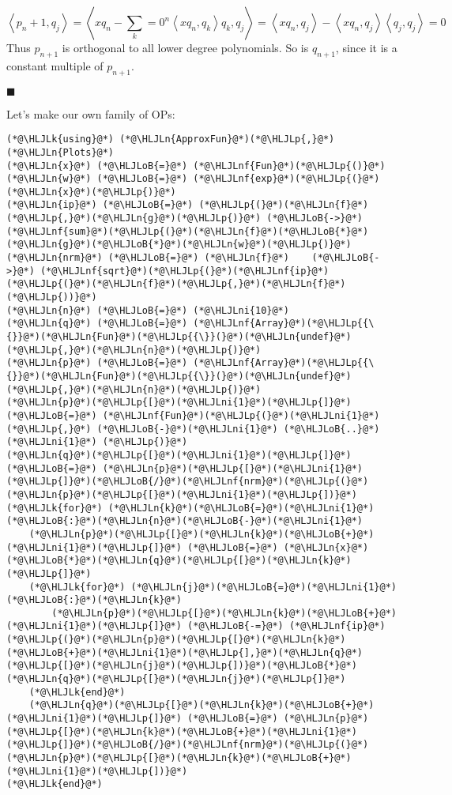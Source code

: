 \documentclass[12pt,landscape]{article}
\newcommand{\HLJLk}[1]{\textcolor[RGB]{148,91,176}{\textbf{#1}}}
\newcommand{\HLJLn}[1]{#1}
\newcommand{\HLJLnf}[1]{\textcolor[RGB]{66,102,213}{#1}}
\newcommand{\HLJLni}[1]{\textcolor[RGB]{59,151,46}{#1}}
\newcommand{\HLJLoB}[1]{\textcolor[RGB]{102,102,102}{\textbf{#1}}}
\newcommand{\HLJLp}[1]{#1}
\def\ip<#1>{\left\langle{#1}\right\rangle}
\begin{document}
{\[
\ip<p_{n+1}, q_j> = \ip<x q_n - \sum_{k=0}^n {\ip<x q_n, q_k>} q_k, q_j> = \ip<x q_n, q_j> - \ip<x q_n, q_j> \ip<q_j,q_j> = 0
\]
Thus $p_{n+1}$ is orthogonal to all lower degree polynomials. So is $q_{n+1}$, since it is a constant multiple of $p_{n+1}$.

\ensuremath{\blacksquare}

Let's make our own family of OPs:


\begin{lstlisting}
(*@\HLJLk{using}@*) (*@\HLJLn{ApproxFun}@*)(*@\HLJLp{,}@*) (*@\HLJLn{Plots}@*)
(*@\HLJLn{x}@*) (*@\HLJLoB{=}@*) (*@\HLJLnf{Fun}@*)(*@\HLJLp{()}@*)
(*@\HLJLn{w}@*) (*@\HLJLoB{=}@*) (*@\HLJLnf{exp}@*)(*@\HLJLp{(}@*)(*@\HLJLn{x}@*)(*@\HLJLp{)}@*)
(*@\HLJLn{ip}@*) (*@\HLJLoB{=}@*) (*@\HLJLp{(}@*)(*@\HLJLn{f}@*)(*@\HLJLp{,}@*)(*@\HLJLn{g}@*)(*@\HLJLp{)}@*) (*@\HLJLoB{->}@*) (*@\HLJLnf{sum}@*)(*@\HLJLp{(}@*)(*@\HLJLn{f}@*)(*@\HLJLoB{*}@*)(*@\HLJLn{g}@*)(*@\HLJLoB{*}@*)(*@\HLJLn{w}@*)(*@\HLJLp{)}@*)
(*@\HLJLn{nrm}@*) (*@\HLJLoB{=}@*) (*@\HLJLn{f}@*)    (*@\HLJLoB{->}@*) (*@\HLJLnf{sqrt}@*)(*@\HLJLp{(}@*)(*@\HLJLnf{ip}@*)(*@\HLJLp{(}@*)(*@\HLJLn{f}@*)(*@\HLJLp{,}@*)(*@\HLJLn{f}@*)(*@\HLJLp{))}@*)
(*@\HLJLn{n}@*) (*@\HLJLoB{=}@*) (*@\HLJLni{10}@*)
(*@\HLJLn{q}@*) (*@\HLJLoB{=}@*) (*@\HLJLnf{Array}@*)(*@\HLJLp{{\{}}@*)(*@\HLJLn{Fun}@*)(*@\HLJLp{{\}}(}@*)(*@\HLJLn{undef}@*)(*@\HLJLp{,}@*)(*@\HLJLn{n}@*)(*@\HLJLp{)}@*)
(*@\HLJLn{p}@*) (*@\HLJLoB{=}@*) (*@\HLJLnf{Array}@*)(*@\HLJLp{{\{}}@*)(*@\HLJLn{Fun}@*)(*@\HLJLp{{\}}(}@*)(*@\HLJLn{undef}@*)(*@\HLJLp{,}@*)(*@\HLJLn{n}@*)(*@\HLJLp{)}@*)
(*@\HLJLn{p}@*)(*@\HLJLp{[}@*)(*@\HLJLni{1}@*)(*@\HLJLp{]}@*) (*@\HLJLoB{=}@*) (*@\HLJLnf{Fun}@*)(*@\HLJLp{(}@*)(*@\HLJLni{1}@*)(*@\HLJLp{,}@*) (*@\HLJLoB{-}@*)(*@\HLJLni{1}@*) (*@\HLJLoB{..}@*) (*@\HLJLni{1}@*) (*@\HLJLp{)}@*)
(*@\HLJLn{q}@*)(*@\HLJLp{[}@*)(*@\HLJLni{1}@*)(*@\HLJLp{]}@*) (*@\HLJLoB{=}@*) (*@\HLJLn{p}@*)(*@\HLJLp{[}@*)(*@\HLJLni{1}@*)(*@\HLJLp{]}@*)(*@\HLJLoB{/}@*)(*@\HLJLnf{nrm}@*)(*@\HLJLp{(}@*)(*@\HLJLn{p}@*)(*@\HLJLp{[}@*)(*@\HLJLni{1}@*)(*@\HLJLp{])}@*)
(*@\HLJLk{for}@*) (*@\HLJLn{k}@*)(*@\HLJLoB{=}@*)(*@\HLJLni{1}@*)(*@\HLJLoB{:}@*)(*@\HLJLn{n}@*)(*@\HLJLoB{-}@*)(*@\HLJLni{1}@*)
    (*@\HLJLn{p}@*)(*@\HLJLp{[}@*)(*@\HLJLn{k}@*)(*@\HLJLoB{+}@*)(*@\HLJLni{1}@*)(*@\HLJLp{]}@*) (*@\HLJLoB{=}@*) (*@\HLJLn{x}@*)(*@\HLJLoB{*}@*)(*@\HLJLn{q}@*)(*@\HLJLp{[}@*)(*@\HLJLn{k}@*)(*@\HLJLp{]}@*)
    (*@\HLJLk{for}@*) (*@\HLJLn{j}@*)(*@\HLJLoB{=}@*)(*@\HLJLni{1}@*)(*@\HLJLoB{:}@*)(*@\HLJLn{k}@*)
        (*@\HLJLn{p}@*)(*@\HLJLp{[}@*)(*@\HLJLn{k}@*)(*@\HLJLoB{+}@*)(*@\HLJLni{1}@*)(*@\HLJLp{]}@*) (*@\HLJLoB{-=}@*) (*@\HLJLnf{ip}@*)(*@\HLJLp{(}@*)(*@\HLJLn{p}@*)(*@\HLJLp{[}@*)(*@\HLJLn{k}@*)(*@\HLJLoB{+}@*)(*@\HLJLni{1}@*)(*@\HLJLp{],}@*)(*@\HLJLn{q}@*)(*@\HLJLp{[}@*)(*@\HLJLn{j}@*)(*@\HLJLp{])}@*)(*@\HLJLoB{*}@*)(*@\HLJLn{q}@*)(*@\HLJLp{[}@*)(*@\HLJLn{j}@*)(*@\HLJLp{]}@*)
    (*@\HLJLk{end}@*)
    (*@\HLJLn{q}@*)(*@\HLJLp{[}@*)(*@\HLJLn{k}@*)(*@\HLJLoB{+}@*)(*@\HLJLni{1}@*)(*@\HLJLp{]}@*) (*@\HLJLoB{=}@*) (*@\HLJLn{p}@*)(*@\HLJLp{[}@*)(*@\HLJLn{k}@*)(*@\HLJLoB{+}@*)(*@\HLJLni{1}@*)(*@\HLJLp{]}@*)(*@\HLJLoB{/}@*)(*@\HLJLnf{nrm}@*)(*@\HLJLp{(}@*)(*@\HLJLn{p}@*)(*@\HLJLp{[}@*)(*@\HLJLn{k}@*)(*@\HLJLoB{+}@*)(*@\HLJLni{1}@*)(*@\HLJLp{])}@*)
(*@\HLJLk{end}@*)


\end{lstlisting}}
\end{document}
